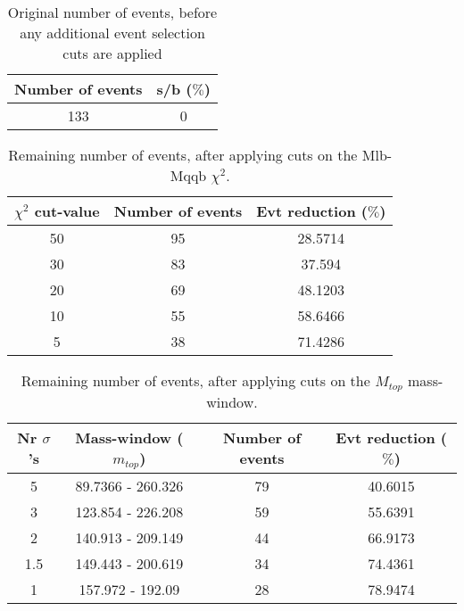 \documentclass{article}
\begin{document}
 

 \begin{abstract} 
 
   The tables in this document represent the influence of the additional event selection cuts that were applied in order to reduce the number of selected events for CPU reasons. \\ 
   The considered cuts are rather basic and are merely developed to reduce the number of so-called wrong events \\ 
   \begin{itemize} 
     \item Cut on Mlb-Mqqb $\chi^{2}$ distribution 
     \item Cut on top and W-mass window 
   \end{itemize} 
 
   \textbf{Created on :} \today 
 \end{abstract} 
 
 \begin{table}[h!t] 
  \caption{Original number of events, before any additional event selection cuts are applied} 
  \centering 
   \begin{tabular}{c|c} 
     Number of events    & s/b ($\%$)     \\ 
     \hline
     133  & 0 
 
   \end{tabular} 
 \end{table} 
 
 \begin{table}[h!t] 
  \caption{Remaining number of events, after applying cuts on the Mlb-Mqqb $\chi^{2}$.} 
  \centering 
   \begin{tabular}{c|c|c|} 
     $\chi^{2}$ cut-value    & Number of events  & Evt reduction ($\%$)    \\ 
     \hline
     50  &   95  &  28.5714 \\ 
     30  &   83  &  37.594 \\ 
     20  &   69  &  48.1203 \\ 
     10  &   55  &  58.6466 \\ 
     5  &   38  &  71.4286 \\ 
   \end{tabular} 
 \end{table} 
 
 \begin{table}[h!t] 
  \caption{Remaining number of events, after applying cuts on the $M_{top}$ mass-window.} 
  \centering 
   \begin{tabular}{c|c|c|c|}
     Nr $\sigma$'s & Mass-window ($m_{top}$)   & Number of events   & Evt reduction ($\%$)     \\
     \hline
     5 & 89.7366 - 260.326  &   79 &  40.6015 \\ 
     3 & 123.854 - 226.208  &   59 &  55.6391 \\ 
     2 & 140.913 - 209.149  &   44 &  66.9173 \\ 
     1.5 & 149.443 - 200.619  &   34 &  74.4361 \\ 
     1 & 157.972 - 192.09  &   28 &  78.9474 \\ 
   \end{tabular} 
 \end{table} 
 
\end{document}
